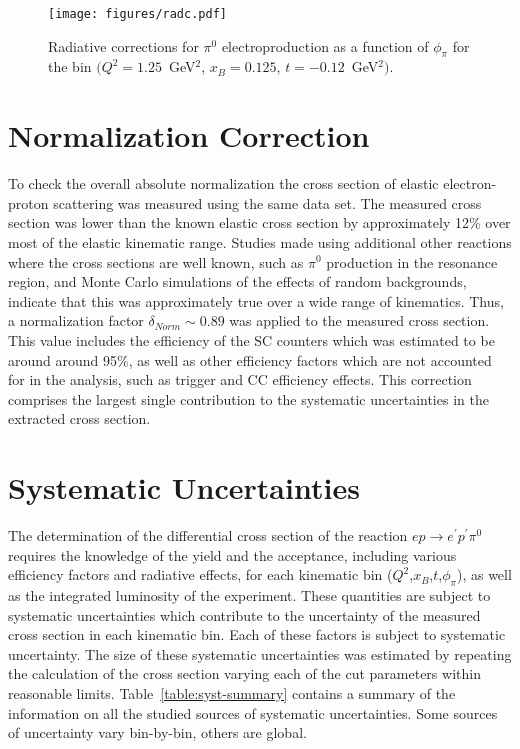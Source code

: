 \documentclass[prc,floatfix,twocolumn,superscriptaddress,letter]{revtex4}
\begin{document}
\begin{figure}
\centering
\texttt{[image: figures/radc.pdf]}
\caption{Radiative corrections for  $\pi^0$ electroproduction as a function of $\phi_\pi$ for the bin
$(Q^2=1.25$~GeV$^2$, $x_B=0.125$, $t=-0.12$~GeV$^2)$.}
\label{fig:rc_2d}
\end{figure}




\section{Normalization Correction}
\label{normalization}
To check the overall absolute normalization   the cross section of  elastic electron-proton scattering was measured using the same data set.  The measured cross section was lower than the known elastic cross section by approximately 12\% over most of the elastic kinematic range. Studies made using additional other reactions where the cross sections are well known, such as $\pi^0$ production in the resonance region, and Monte Carlo simulations of the effects of random backgrounds, indicate that this was approximately true over a wide range of kinematics. Thus, a normalization factor $\delta_{Norm}\sim 0.89$ was  applied to the measured cross section. This value includes the efficiency of the SC counters which was estimated to be around  around 95\%, as well as other efficiency factors which are not accounted for in the analysis, such as trigger and CC efficiency effects. 
This correction comprises the largest single contribution to the systematic uncertainties in the extracted cross section.

\section{Systematic Uncertainties}
\label{systematics}

The determination of  the  differential cross section of the reaction $ep\to e^\prime p^\prime\pi^0$
requires the knowledge of  the yield and the acceptance, including various efficiency factors and radiative effects, for each kinematic bin ($Q^2$,$x_B$,$t$,$\phi_\pi$),  as well as the integrated luminosity of the experiment. These quantities are subject to systematic uncertainties which contribute to the uncertainty of the measured cross section in each kinematic bin.
 Each of these factors is subject to systematic uncertainty. The size of these systematic  uncertainties was estimated 
by  repeating the calculation of the cross section varying  each of the cut parameters within reasonable limits.
Table~\ref{table:syst-summary} contains a summary of the information on all the studied sources of systematic uncertainties. Some sources of uncertainty vary bin-by-bin, others are global.
\end{document}
